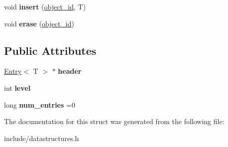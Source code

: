\begin{DoxyCompactItemize}
\item 
\hypertarget{structmlnet_1_1_object_store_a34c71f924ab5237a4d6f62bd599d7838}{void {\bfseries insert} (\hyperlink{namespacemlnet_a318fc9bfdb74e1da4d44d0c50d4a453d}{object\+\_\+id}, T)}\label{structmlnet_1_1_object_store_a34c71f924ab5237a4d6f62bd599d7838}

\item 
\hypertarget{structmlnet_1_1_object_store_a7ad1b5b812287d66663f41ab13bdd7d2}{void {\bfseries erase} (\hyperlink{namespacemlnet_a318fc9bfdb74e1da4d44d0c50d4a453d}{object\+\_\+id})}\label{structmlnet_1_1_object_store_a7ad1b5b812287d66663f41ab13bdd7d2}

\end{DoxyCompactItemize}
\subsection*{Public Attributes}
\begin{DoxyCompactItemize}
\item 
\hypertarget{structmlnet_1_1_object_store_a908a1714f815fa1ab268ef3ce9babcd1}{\hyperlink{structmlnet_1_1_entry}{Entry}$<$ T $>$ $\ast$ {\bfseries header}}\label{structmlnet_1_1_object_store_a908a1714f815fa1ab268ef3ce9babcd1}

\item 
\hypertarget{structmlnet_1_1_object_store_a46ff7b52c13512981554f55bcd3afdc0}{int {\bfseries level}}\label{structmlnet_1_1_object_store_a46ff7b52c13512981554f55bcd3afdc0}

\item 
\hypertarget{structmlnet_1_1_object_store_aa03501c4dac11fc23f1f8d4eee89b734}{long {\bfseries num\+\_\+entries} =0}\label{structmlnet_1_1_object_store_aa03501c4dac11fc23f1f8d4eee89b734}

\end{DoxyCompactItemize}


The documentation for this struct was generated from the following file\+:\begin{DoxyCompactItemize}
\item 
include/datastructures.\+h\end{DoxyCompactItemize}
